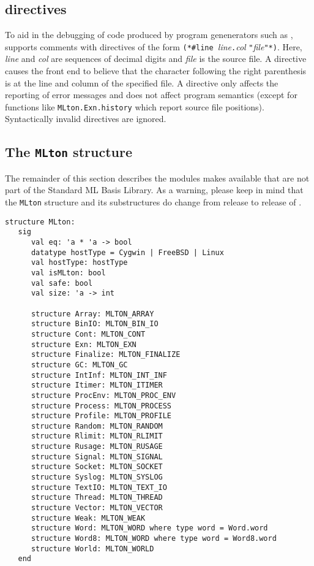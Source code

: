 
\subsection{{\nline} directives}
To aid in the debugging of code produced by program genenerators such as
,
{\mlton} supports comments with {\nline} directives of the form {\tt (*\#line
}{\it line}{\tt.}{\it col} {\tt "}{\it file}{\tt"*)}.  Here, {\it line} and {\it
col} are sequences of decimal digits and {\it file} is the source file.  A
{\nline} directive causes the front end to believe that the character following
the right parenthesis is at the line and column of the specified file.  A
{\nline} directive only affects the reporting of error messages and does not
affect program semantics (except for functions like {\tt MLton.Exn.history}
which report source file positions).  Syntactically invalid {\nline} directives
are ignored.

\subsection{The {\tt MLton} structure}

The remainder of this section describes the modules {\mlton} makes
available that are not part of the Standard ML Basis Library.  As a
warning, please keep in mind that the {\tt MLton} structure and its
substructures do change from release to release of {\mlton}.

\begin{verbatim}
structure MLton:
   sig
      val eq: 'a * 'a -> bool
      datatype hostType = Cygwin | FreeBSD | Linux
      val hostType: hostType
      val isMLton: bool
      val safe: bool
      val size: 'a -> int

      structure Array: MLTON_ARRAY
      structure BinIO: MLTON_BIN_IO
      structure Cont: MLTON_CONT
      structure Exn: MLTON_EXN
      structure Finalize: MLTON_FINALIZE
      structure GC: MLTON_GC
      structure IntInf: MLTON_INT_INF
      structure Itimer: MLTON_ITIMER
      structure ProcEnv: MLTON_PROC_ENV
      structure Process: MLTON_PROCESS
      structure Profile: MLTON_PROFILE
      structure Random: MLTON_RANDOM
      structure Rlimit: MLTON_RLIMIT
      structure Rusage: MLTON_RUSAGE
      structure Signal: MLTON_SIGNAL
      structure Socket: MLTON_SOCKET
      structure Syslog: MLTON_SYSLOG
      structure TextIO: MLTON_TEXT_IO
      structure Thread: MLTON_THREAD
      structure Vector: MLTON_VECTOR
      structure Weak: MLTON_WEAK
      structure Word: MLTON_WORD where type word = Word.word
      structure Word8: MLTON_WORD where type word = Word8.word
      structure World: MLTON_WORLD
   end
\end{verbatim}

